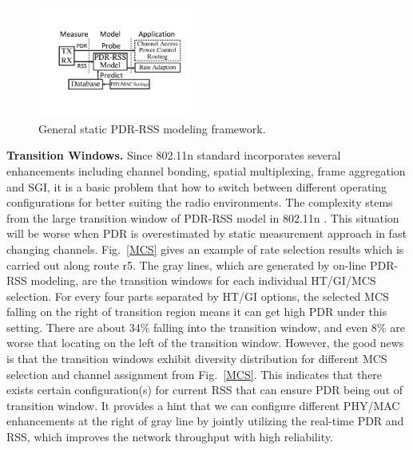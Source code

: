 \documentclass[draftclsnofoot,journal,onecolumn,11pt]{IEEEtran}
\begin{document}
\begin{figure}[!t]
\centering
\includegraphics[width=0.45\textwidth]{modeling1.pdf}
\caption{General static PDR-RSS modeling framework.}
\label{offlinemodel}
\end{figure}

\textbf{Transition Windows.} Since 802.11n standard incorporates several enhancements including channel bonding, spatial multiplexing, frame aggregation and SGI, it is a basic problem that how to switch between different operating configurations for better suiting the radio environments. The complexity stems from the large transition window of PDR-RSS model in 802.11n \cite{Halperin2010predictable}. This situation will be worse when PDR is overestimated by static measurement approach in fast changing channels. Fig.~\ref{MCS} gives an example of rate selection results which is carried out along route r5. The gray lines, which are generated by on-line PDR-RSS modeling, are the transition windows for each individual HT/GI/MCS selection. For every four parts separated by HT/GI options, the selected MCS falling on the right of transition region means it can get high PDR under this setting. There are about 34\% falling into the transition window, and even 8\% are worse that locating on the left of the transition window. However, the good news is that the transition windows exhibit diversity distribution for different MCS selection and channel assignment from Fig.~\ref{MCS}. This indicates that there exists certain configuration(s) for current RSS that can ensure PDR being out of transition window. It provides a hint that we can configure different PHY/MAC enhancements at the right of gray line by jointly utilizing the real-time PDR and RSS, which improves the network throughput with high reliability.
\end{document}
